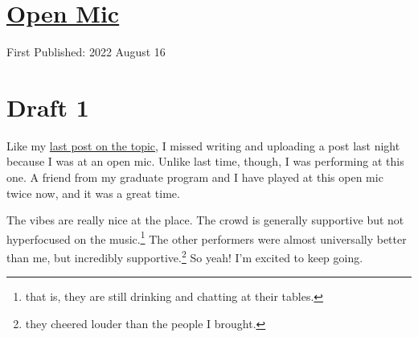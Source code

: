 \documentclass[12pt]{article}[titlepage]
\newcommand{\1}{\={a}}
\newcommand{\2}{\={e}}
\newcommand{\3}{\={\i}}
\newcommand{\4}{\=o}
\newcommand{\5}{\=u}
\newcommand{\6}{\={A}}
\renewcommand{\,}{\textsuperscript{,}}
\begin{document}
\doublespacing
\section{\href{open-mic-2.html}{Open Mic}}
First Published: 2022 August 16


\section{Draft 1}
Like my \href{open-mic.html}{last post on the topic}, I missed writing and uploading a post last night because I was at an open mic.
Unlike last time, though, I was performing at this one.
A friend from my graduate program and I have played at this open mic twice now, and it was a great time.

The vibes are really nice at the place.
The crowd is generally supportive but not hyperfocused on the music.\footnote{that is, they are still drinking and chatting at their tables.}
The other performers were almost universally better than me, but incredibly supportive.\footnote{they cheered louder than the people I brought.}
So yeah! I'm excited to keep going.
\end{document}
